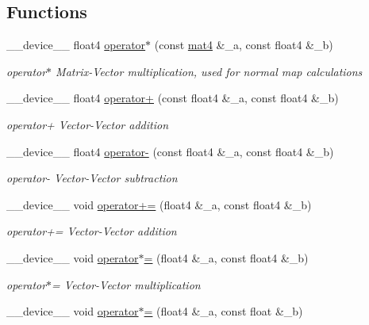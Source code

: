 \subsection*{Functions}
\begin{DoxyCompactItemize}
\item 
\-\_\-\-\_\-device\-\_\-\-\_\- float4 \hyperlink{MathHelpers_8cuh_a6c4b60926b6de2cc4677b88a0eb38592}{operator$\ast$} (const \hyperlink{structmat4}{mat4} \&\-\_\-a, const float4 \&\-\_\-b)
\begin{DoxyCompactList}\small\item\em operator$\ast$ Matrix-\/\-Vector multiplication, used for normal map calculations \end{DoxyCompactList}\item 
\-\_\-\-\_\-device\-\_\-\-\_\- float4 \hyperlink{MathHelpers_8cuh_a6c05ec280b580976b827526db2241e83}{operator+} (const float4 \&\-\_\-a, const float4 \&\-\_\-b)
\begin{DoxyCompactList}\small\item\em operator+ Vector-\/\-Vector addition \end{DoxyCompactList}\item 
\-\_\-\-\_\-device\-\_\-\-\_\- float4 \hyperlink{MathHelpers_8cuh_a7dc2dab63123e6b57bd81d3105e3bc89}{operator-\/} (const float4 \&\-\_\-a, const float4 \&\-\_\-b)
\begin{DoxyCompactList}\small\item\em operator-\/ Vector-\/\-Vector subtraction \end{DoxyCompactList}\item 
\-\_\-\-\_\-device\-\_\-\-\_\- void \hyperlink{MathHelpers_8cuh_aebfed131f08629907ecd235839a55955}{operator+=} (float4 \&\-\_\-a, const float4 \&\-\_\-b)
\begin{DoxyCompactList}\small\item\em operator+= Vector-\/\-Vector addition \end{DoxyCompactList}\item 
\-\_\-\-\_\-device\-\_\-\-\_\- void \hyperlink{MathHelpers_8cuh_ad74d65299664baf9e31b9fd5b80ffaaf}{operator$\ast$=} (float4 \&\-\_\-a, const float4 \&\-\_\-b)
\begin{DoxyCompactList}\small\item\em operator$\ast$= Vector-\/\-Vector multiplication \end{DoxyCompactList}\item 
\-\_\-\-\_\-device\-\_\-\-\_\- void \hyperlink{MathHelpers_8cuh_a4b0908aeb68c540e1d8eab24be0457f2}{operator$\ast$=} (float4 \&\-\_\-a, const float \&\-\_\-b)

\end{DoxyCompactItemize}
